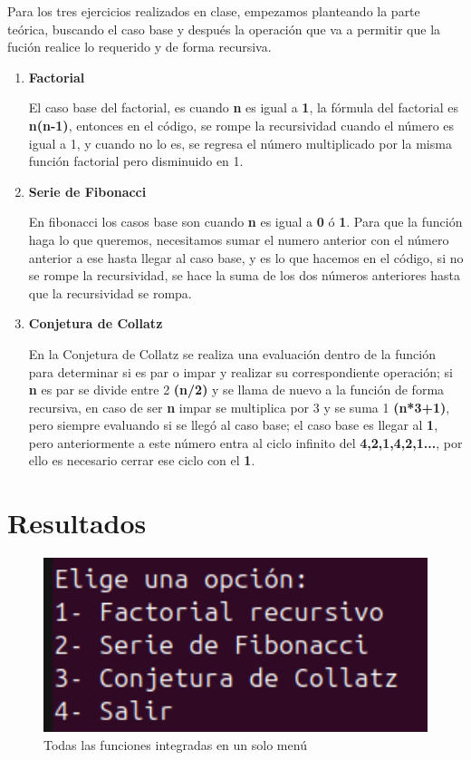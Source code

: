 \documentclass[letterpaper,12pt]{article}
\begin{document}
Para los tres ejercicios realizados en clase, empezamos planteando la parte teórica, buscando el caso base y después la operación que va a permitir que la fución realice lo requerido y de forma recursiva. 
\begin{enumerate}

    \item \textbf{Factorial}

    El caso base del factorial, es cuando \textbf{n} es igual a \textbf{1}, la fórmula del factorial es \textbf{n(n-1)}, entonces en el código, se rompe la recursividad cuando el número es igual a 1, y cuando no lo es, se regresa el número multiplicado por la misma función factorial pero disminuido en 1.

    \item \textbf{Serie de Fibonacci}

    En fibonacci los casos base son cuando \textbf{n} es igual a \textbf{0} ó \textbf{1}. Para que la función haga lo que queremos, necesitamos sumar el numero anterior con el número anterior a ese hasta llegar al caso base, y es lo que hacemos en el código, si no se rompe la recursividad, se hace la suma de los dos números anteriores hasta que la recursividad se rompa.  

    \clearpage

    \item \textbf{Conjetura de Collatz}

    En la Conjetura de Collatz se realiza una evaluación dentro de la función para determinar si es par o impar y realizar su correspondiente operación; si \textbf{n} es par se divide entre 2 \textbf{(n/2)} y se llama de nuevo a la función de forma recursiva, en caso de ser \textbf{n} impar se multiplica por 3 y se suma 1 \textbf{(n*3+1)}, pero siempre evaluando si se llegó al caso base; el caso base es llegar al \textbf{1}, pero anteriormente a este número entra al ciclo infinito del \textbf{4,2,1,4,2,1...}, por ello es necesario cerrar ese ciclo con el \textbf{1}. 
    
\end{enumerate}




\section{Resultados}

\begin{figure}[H]
    \centering
    \includegraphics[width=12cm]{Imagenes/Menu.png}
    \caption{Todas las funciones integradas en un solo menú}
\end{figure}
\end{document}
